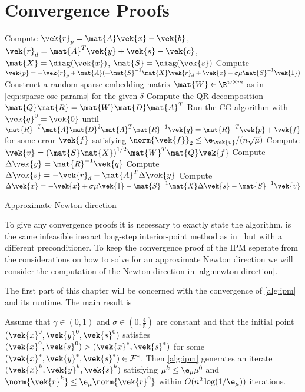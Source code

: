 \chapter{Convergence Proofs}\label{chap:convergence}

\begin{algorithm}[p]
  Compute \(\vek{r}_p = \mat{A}\vek{x} - \vek{b}\), \(\vek{r}_d = \mat{A}^T \vek{y} + \vek{s} - \vek{c}\), \(\mat{X} = \diag(\vek{x})\), \(\mat{S} = \diag(\vek{s})\)\;
  Compute \(\vek{p} = -\vek{r}_p + \mat{A}(-\mat{S}^{-1}\mat{X}\vek{r}_d + \vek{x} - \sigma \mu \mat{S}^{-1} \vek{1})\)\;
  Construct a random sparse embedding matrix \(\mat{W} \in \R^{w \times m}\) as in \cref{eqn:sparse-ose-params} for the given \(\delta\)\;
  Compute the QR decomposition \(\mat{Q} \mat{R} = \mat{W} \mat{D} \mat{A}^T\)\;
  Run the CG algorithm with \(\vek{q}^0 = \vek{0}\) until \(\mat{R}^{-T} \mat{A} \mat{D}^2 \mat{A}^T \mat{R}^{-1} \vek{q} = \mat{R}^{-T} \vek{p} + \vek{f}\) for some error \(\vek{f}\) satisfying \(\norm{\vek{f}}_2 \leq \e_{\vek{v}}/(n \sqrt{\mu})\)\;\label{line:cg}
  Compute \(\vek{v} = {(\mat{S} \mat{X})}^{1/2} \mat{W}^T \mat{Q} \vek{f}\)\;\label{line:compute-v}
  Compute \(\Delta\vek{y} = \mat{R}^{-1}\vek{q}\)\;
  Compute \(\Delta\vek{s} = -\vek{r}_d - \mat{A}^T \Delta\vek{y}\)\;
  Compute \(\Delta\vek{x} = -\vek{x} + \sigma \mu \vek{1} - \mat{S}^{-1}\mat{X} \Delta\vek{s} - \mat{S}^{-1} \vek{v}\)\;\label{line:compute-delta-x}
  \;
  \caption{Approximate Newton direction}\label{alg:newton-direction}
\end{algorithm}

To give any convergence proofs it is necessary to exactly state the algorithm.
 is the same infeasible inexact long-step interior-point method as in~\cite{Avron-FasterRandomizedInfeasibleIPMs,Monteiro-ConvergenceAnalysisLongStepInfeasibleIPMs} but with a different preconditioner.
To keep the convergence proof of the IPM seperate from the considerations on how to solve for an approximate Newton direction we will consider the computation of the Newton direction in \cref{alg:newton-direction}.

The first part of this chapter will be concerned with the convergence of \cref{alg:ipm} and its runtime.
The main result is
\begin{theorem}
Assume that \(\gamma \in (0, 1)\) and \(\sigma \in (0, \frac{4}{5})\) are constant and that the initial point \((\vek{x}^0, \vek{y}^0, \vek{s}^0)\) satisfies \((\vek{x}^0, \vek{s}^0) > (\vek{x}^*, \vek{s}^*)\) for some \((\vek{x}^*, \vek{y}^*, \vek{s}^*) \in \mathcal{F}^*\).
Then \cref{alg:ipm} generates an iterate \((\vek{x}^k, \vek{y}^k, \vek{s}^k)\) satisfying \(\mu^k \leq \e_\mu \mu^0\) and \(\norm{\vek{r}^k} \leq \e_\mu \norm{\vek{r}^0}\) within \(O(n^2 \log(1/\e_\mu))\) iterations.
\end{theorem}

